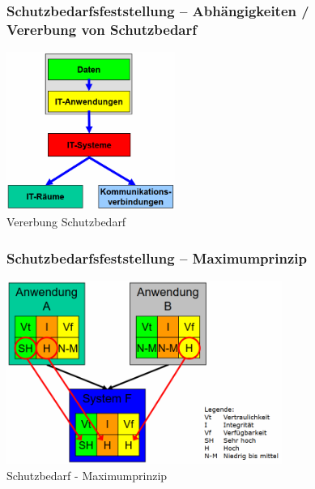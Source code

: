 \documentclass[10pt,a4paper]{article}
\begin{document}
\begin{figure}[H]
\subsubsection*{Schutzbedarfsfeststellung – Abhängigkeiten / Vererbung von Schutzbedarf}
    \begin{center}
    \includegraphics[width=5.5cm]{images/Vererbung Schutzbedarf.png}
    \caption{Vererbung Schutzbedarf}
    \label{Vererbung Schutzbedarf}
    \end{center}
\end{figure}

\begin{figure}[H]
\subsubsection*{Schutzbedarfsfeststellung – Maximumprinzip}
    \begin{center}
    \includegraphics[width=9cm]{images/Schutzbedarf - Maximumprinzip.png}
    \caption{Schutzbedarf - Maximumprinzip}
    \label{Schutzbedarf - Maximumprinzip}
    \end{center}
\end{figure}

\pagebreak
\end{document}
